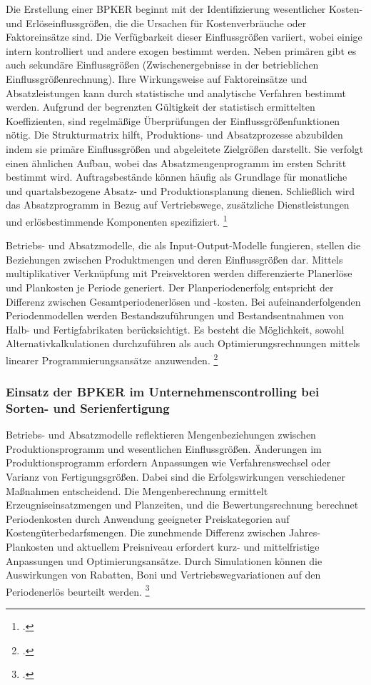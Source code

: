 Die Erstellung einer BPKER beginnt mit der Identifizierung wesentlicher Kosten- und Erlöseinflussgrö{\ss}en, die die Ursachen für Kostenverbräuche oder Faktoreinsätze sind. Die Verfügbarkeit dieser Einflussgrö{\ss}en variiert, wobei einige intern kontrolliert und andere exogen bestimmt werden. Neben primären gibt es auch sekundäre Einflussgrö{\ss}en (Zwischenergebnisse in der betrieblichen Einflussgrö{\ss}enrechnung). Ihre Wirkungsweise auf Faktoreinsätze und Absatzleistungen kann durch statistische und analytische Verfahren bestimmt werden. Aufgrund der begrenzten Gültigkeit der statistisch ermittelten Koeffizienten, sind regelmä{\ss}ige Überprüfungen der Einflussgrö{\ss}enfunktionen nötig. Die Strukturmatrix hilft, Produktions- und Absatzprozesse abzubilden indem sie primäre Einflussgrö{\ss}en und abgeleitete Zielgrö{\ss}en darstellt. Sie verfolgt einen ähnlichen Aufbau, wobei das Absatzmengenprogramm im ersten Schritt bestimmt wird. Auftragsbestände können häufig als Grundlage für monatliche und quartalsbezogene Absatz- und Produktionsplanung dienen. Schlie{\ss}lich wird das Absatzprogramm in Bezug auf Vertriebswege, zusätzliche Dienstleistungen und erlösbestimmende Komponenten spezifiziert. \footcite[Vgl.][S. 299ff]{Artikel_orginal}

Betriebs- und Absatzmodelle, die als Input-Output-Modelle fungieren, stellen die Beziehungen zwischen Produktmengen und deren Einflussgrö{\ss}en dar. Mittels multiplikativer Verknüpfung mit Preisvektoren werden differenzierte Planerlöse und Plankosten je Periode generiert. Der Planperiodenerfolg entspricht der Differenz zwischen Gesamtperiodenerlösen und -kosten. Bei aufeinanderfolgenden Periodenmodellen werden Bestandszuführungen und Bestandsentnahmen von Halb- und Fertigfabrikaten berücksichtigt. Es besteht die Möglichkeit, sowohl Alternativkalkulationen durchzuführen als auch Optimierungsrechnungen mittels linearer Programmierungsansätze anzuwenden. \footcite[Vgl.][S. 302]{Artikel_orginal}

\subsubsection{Einsatz der BPKER im Unternehmenscontrolling bei Sorten- und Serienfertigung}

Betriebs- und Absatzmodelle reflektieren Mengenbeziehungen zwischen Produktionsprogramm und wesentlichen Einflussgrö{\ss}en. Änderungen im Produktionsprogramm erfordern Anpassungen wie Verfahrenswechsel oder Varianz von Fertigungsgrö{\ss}en. Dabei sind die Erfolgswirkungen verschiedener Ma{\ss}nahmen entscheidend. Die Mengenberechnung ermittelt Erzeugniseinsatzmengen und Planzeiten, und die Bewertungsrechnung berechnet Periodenkosten durch Anwendung geeigneter Preiskategorien auf Kostengüterbedarfsmengen. Die zunehmende Differenz zwischen Jahres-Plankosten und aktuellem Preisniveau erfordert kurz- und mittelfristige Anpassungen und Optimierungsansätze. Durch Simulationen können die Auswirkungen von Rabatten, Boni und Vertriebswegvariationen auf den Periodenerlös beurteilt werden. \footcite[Vgl.][S. 303ff]{Artikel_orginal}

